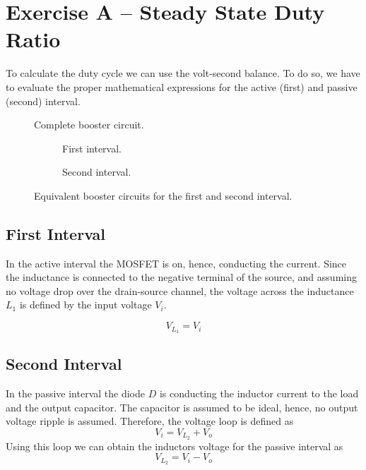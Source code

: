 \section{Exercise A -- Steady State Duty Ratio}
To calculate the duty cycle we can use the volt-second balance.
To do so, we have to evaluate the proper mathematical expressions
for the active (first) and passive (second) interval.

\begin{figure}[h!]
	\centering
	\def\svgscale{\schematicscale}
	
	\caption{Complete booster circuit.}
\end{figure}

\begin{figure}[h!]
	\centering
	\begin{subfigure}[b]{0.48\textwidth}
		\centering
		\def\svgscale{\schematicscale}
		
		\caption{First interval.}
	\end{subfigure}
	\begin{subfigure}[b]{0.48\textwidth}
		\centering
		\def\svgscale{\schematicscale}
		
		\caption{Second interval.}
	\end{subfigure}
	\caption{Equivalent booster circuits for the first and second interval.}
\end{figure}


\subsection{First Interval}
In the active interval the MOSFET is on, hence, conducting the current.
Since the inductance is connected to the negative terminal of the source,
and assuming no voltage drop over the drain-source channel, the voltage
across the inductance $L_1$ is defined by the input voltage $V_i$. 

\[ V_{L_{1}} = V_i \]

%	

\subsection{Second Interval}
In the passive interval the diode $D$ is conducting the inductor
current to the load and the output capacitor. The capacitor is assumed
to be ideal, hence, no output voltage ripple is assumed. Therefore, the
voltage loop is defined as
\[ V_i = V_{L_{2}} + V_o \]
Using this loop we can obtain the inductors voltage for the passive
interval as
\[ V_{L_{2}} = V_i - V_o \]

